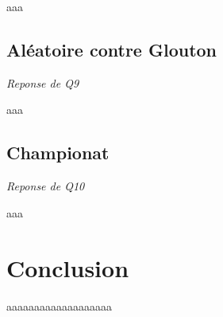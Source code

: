 \documentclass[a4paper,11pt]{article}
\begin{document}
aaa

\subsection{Aléatoire contre Glouton}
\emph{Reponse de Q9}

aaa

\subsection{Championat}
\emph{Reponse de Q10}

aaa

\section{Conclusion}

aaaaaaaaaaaaaaaaaaa
\end{document}
